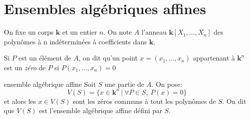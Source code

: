 \newcommand{\korps}{\textbf{k}}

\section{Ensembles algébriques affines}

On fixe un corps $\korps$ et un entier $n$. 
On note $A$ l'anneau $\korps[X_1, \dots, X_n]$ des polynômes à n indéterminées à coefficients dans $\korps$.

Si $P$ est un élément de $A$, on dit qu'un point $x = (x_1, \dots, x_n)$ 
appartenant à $\korps^n$ est un \textit{zéro} de $P$ si $P(x_1, \dots, x_n) = 0$

\begin{definition}{ensemble algébrique affine}{}
    Soit $S$ une partie de $A$. On pose:
    \[V(S) = \{x \in \korps^n ~ | ~ \forall P \in S, ~ P(x) = 0\}\]
    et alors les $x \in V(S)$ sont les zéros communs à tout les polynômes de $S$.
    On dit que $V(S)$ est l'ensemble algébrique affine défini par $S$.
\end{definition}

